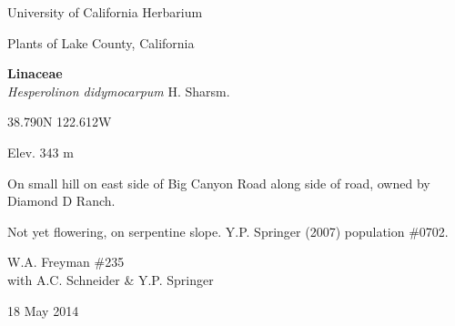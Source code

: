 \documentclass[letterpaper,10pt]{article}
\begin{document}
\begin{minipage}[t]{0.40\textwidth}

\begin{center}
University of California Herbarium \\
\begin{large}
Plants of Lake County, California \\
\end{large}
\vspace{\baselineskip}
\textbf{Linaceae} \\
\textit{Hesperolinon didymocarpum} H. Sharsm.\\
\end{center}

\begin{footnotesize}

\begin{multicols}{2}
38.790\textdegree N 122.612\textdegree W
\columnbreak
\begin{flushright}
Elev. 343 m
\end{flushright}
\end{multicols}

On small hill on east side of Big Canyon Road along side of road, owned by Diamond D Ranch.
\vspace{\baselineskip}

Not yet flowering, on serpentine slope. Y.P. Springer (2007) population \#0702.

\begin{multicols}{2}
W.A. Freyman \#235 \\
with A.C. Schneider \& Y.P. Springer
\columnbreak
\begin{flushright}
18 May 2014
\end{flushright}
\end{multicols}

\end{footnotesize}

\end{minipage}

\vspace{2cm}
%
%

%
%
\end{document}
